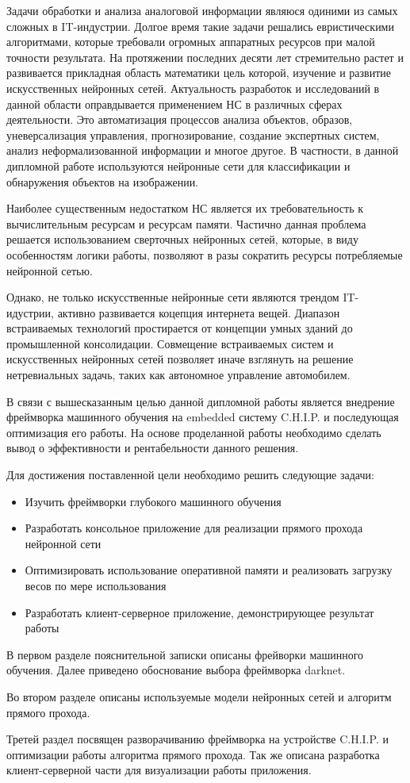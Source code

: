 \documentclass[a4paper,english,russian]{G2-105}
\begin{document}
\par Задачи обработки и анализа аналоговой информации являюся одиними из самых сложных в IT-индустрии. Долгое
время такие задачи решались евристическими алгоритмами, которые требовали огромных аппаратных ресурсов при малой точности результата. На протяжении последних десяти лет стремительно растет и развивается прикладная область математики цель которой, изучение и развитие искусственных нейронных сетей. Актуальность разработок и исследований в данной области оправдывается применением НС в различных сферах деятельности. Это автоматизация процессов анализа объектов, образов, уневерсализация управления, прогнозирование, создание экспертных систем, анализ неформализованной информации и многое другое. В частности, в данной дипломной работе используются нейронные сети для классификации и обнаружения объектов на изображении. 
\par Наиболее существенным недостатком НС является их требовательность к вычислительным ресурсам и ресурсам памяти. Частично данная проблема решается использованием сверточных нейронных сетей, которые, в виду особенностям логики работы, позволяют в разы сократить ресурсы потребляемые нейронной сетью.
\par Однако, не только искусственные нейронные сети являются трендом IT-идустрии, активно развивается коцепция интернета вещей. Диапазон встраиваемых технологий простирается от концепции умных зданий до промышленной консолидации. Совмещение встраиваемых систем и искусственных нейронных сетей позволяет иначе взглянуть на решение нетревиальных задачь, таких как автономное управление автомобилем.
\par В связи с вышесказанным целью данной дипломной работы является внедрение фреймворка машинного обучения на embedded систему C.H.I.P. и последующая оптимизация его работы. На основе проделанной работы необходимо сделать вывод о эффективности и рентабельности данного решения. 
\par Для достижения поставленной цели необходимо решить следующие задачи:
\begin{itemize}
\item Изучить фреймворки глубокого машинного обучения
\item Разработать консольное приложение для реализации прямого прохода нейронной сети
\item Оптимизировать использование оперативной памяти и реализовать загрузку весов по мере использования
\item Разработать клиент-серверное приложение, демонстрирующее результат работы
\end{itemize}
\par В первом разделе пояснительной записки описаны фрейворки машинного обучения. Далее приведено обоснование выбора фреймворка darknet.
\par Во втором разделе описаны используемые модели нейронных сетей и алгоритм прямого прохода.
\par Третей раздел посвящен разворачиванию фреймворка на устройстве C.H.I.P. и оптимизации работы алгоритма прямого прохода. Так же описана разработка клиент-серверной части для визуализации работы приложения. 
\newpage
\end{document}
